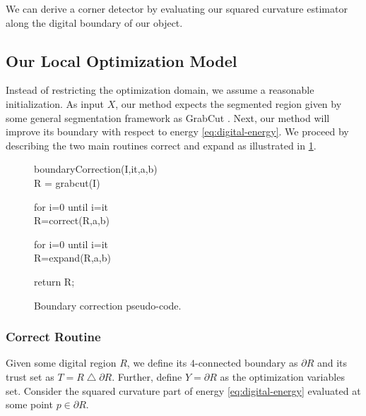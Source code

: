 \documentclass[runningheads]{llncs}
\begin{document}
We can derive a corner detector by evaluating our squared curvature estimator along the digital boundary of our object.


\subsection{Our Local Optimization Model}


Instead of restricting the optimization domain, we assume a reasonable initialization. As input $X$, our method expects the segmented region given by some general segmentation framework as GrabCut \cite{rother04}. Next, our method will improve its boundary with respect to energy \eqref{eq:digital-energy}. We proceed by describing the two main routines correct and expand as illustrated in \ref{alg:boundary-correction}.


\begin{figure}
\begin{tt}
boundaryCorrection(I,it,a,b)\\
\hspace{2pt} R = grabcut(I)\\
\vspace{2pt}

\hspace{2pt} for i=0 until i=it\\
\hspace{4pt} R=correct(R,a,b)\\
\vspace{2pt}

\hspace{2pt} for i=0 until i=it\\
\hspace{4pt} R=expand(R,a,b)\\
\vspace{2pt}

\hspace{2pt} return R;

\end{tt}
   \caption{Boundary correction pseudo-code.}
      \label{alg:boundary-correction}
\end{figure}

\subsubsection{Correct Routine}

Given some digital region $R$, we define its $4$-connected boundary as $\partial R$ and its trust set as $T = R \bigtriangleup \partial R$. Further, define $Y=\partial R$ as the optimization variables set. Consider the squared curvature part of energy \eqref{eq:digital-energy} evaluated at some point $p \in \partial R$.
\end{document}
